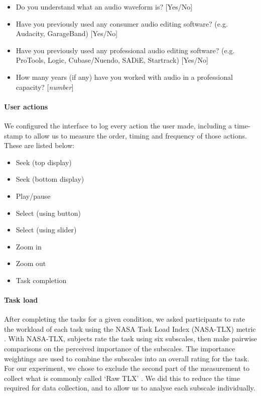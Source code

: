{\singlespacing
\begin{itemize}
  \item Do you understand what an audio waveform is? [Yes/No]
  \item Have you previously used any consumer audio editing software? (e.g.
    Audacity, GarageBand) [Yes/No]
  \item Have you previously used any professional audio editing software? (e.g.
    ProTools, Logic, Cubase/Nuendo, SADiE, Startrack) [Yes/No]
  \item How many years (if any) have you worked with audio in a professional
    capacity? [\textit{number}]
\end{itemize}
}

\paragraph{User actions}
We configured the interface to log every action the user made, including a time-stamp to allow us to measure the order,
timing and frequency of those actions. These are listed below:

{\singlespacing
\begin{itemize}
  \item Seek (top display)
  \item Seek (bottom display)
  \item Play/pause
  \item Select (using button)
  \item Select (using slider)
  \item Zoom in
  \item Zoom out
  \item Task completion
\end{itemize}
}

\paragraph{Task load}
After completing the tasks for a given condition, we asked participants to rate the workload of each task using the
NASA Task Load Index (NASA-TLX) metric \citep{Hart1988}.  With NASA-TLX, subjects rate the task using six subscales,
then make pairwise comparisons on the perceived importance of the subscales. The importance weightings are used to
combine the subscales into an overall rating for the task. For our experiment, we chose to exclude the second part of
the measurement to collect what is commonly called `Raw TLX' \citep{Hart2006}. We did this to reduce the time required
for data collection, and to allow us to analyse each subscale individually.

